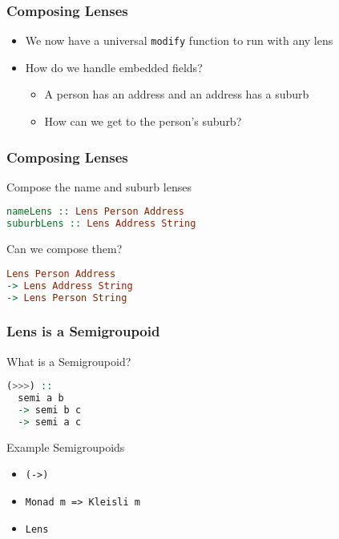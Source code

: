 \begin{frame}[fragile]
\frametitle{Composing Lenses}

\begin{itemize}
\item We now have a universal \lstinline[language=haskell]$modify$ function to run with any lens
\item How do we handle embedded fields?
  \begin{itemize}
  \item A person has an address and an address has a suburb
  \item How can we get to the person's suburb?
  \end{itemize}
\end{itemize}

\end{frame}

\begin{frame}[fragile]
\frametitle{Composing Lenses}

\begin{block}{Compose the name and suburb lenses}
\begin{lstlisting}[language=haskell]
nameLens :: Lens Person Address
suburbLens :: Lens Address String
\end{lstlisting}
\end{block}

\begin{block}{Can we compose them?}
\begin{lstlisting}[language=haskell]
Lens Person Address
-> Lens Address String
-> Lens Person String
\end{lstlisting}
\end{block}

\end{frame}

\begin{frame}[fragile]
\frametitle{Lens is a Semigroupoid}

\begin{block}{What is a Semigroupoid?}
\begin{lstlisting}[language=haskell]
(>>>) ::
  semi a b
  -> semi b c
  -> semi a c
\end{lstlisting}

\end{block}

\begin{block}{Example Semigroupoids}
\begin{itemize}
\item \lstinline$(->)$
\item \lstinline$Monad m => Kleisli m$
\item \lstinline$Lens$
\end{itemize}
\end{block}

\end{frame}

